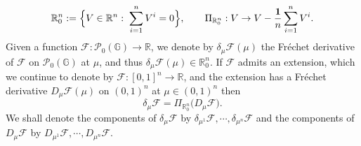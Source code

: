 \documentclass[10pt]{article}
\numberwithin{equation}{section}
\newcommand{\cF}{ \mathcal{F}}
\newcommand{\cP}{ \mathcal{P}}
\newcommand{\bG}{\mathbb G}
\newcommand{\bR}{\mathbb R}
\begin{document}
$$
\bR^n_0:=\Big\{V \in \bR^n:\; \sum_{i=1}^n V^i=0 \Big\}, \qquad \Pi_{\bR^n_0}: V \to V-{{\bf 1} \over n} \sum_{i=1}^n V^i.
$$ 
Given a function $\cF: \cP_0(\bG) \to \bR$, we denote by $\delta_{\mu} \cF(\mu)$ the Fr\'echet derivative of $\cF$ on $\cP_0(\bG)$ at $\mu$, and thus $\delta_{\mu} \cF(\mu) \in \bR^n_0$. If $\cF$ admits an extension, which we continue to denote by $\cF:[0,1]^n \to \bR$, and the extension has a Fr\'echet derivative $D_{\mu} \cF(\mu)$ on $(0,1)^n$ at $\mu \in (0,1)^n$ then 
\begin{equation}\label{eq:jan22.2026}
\delta_{\mu} \cF=\Pi_{\bR^n_0}\Big( D_\mu \cF\Big). 
\end{equation}
We shall denote the components of $\delta_{\mu} \cF$ by $\delta_{\mu^1} \cF, \cdots, \delta_{\mu^n} \cF$ and the components of $D_\mu \cF$ by $D_{\mu^1} \cF, \cdots, D_{\mu^n} \cF.$
\end{document}
